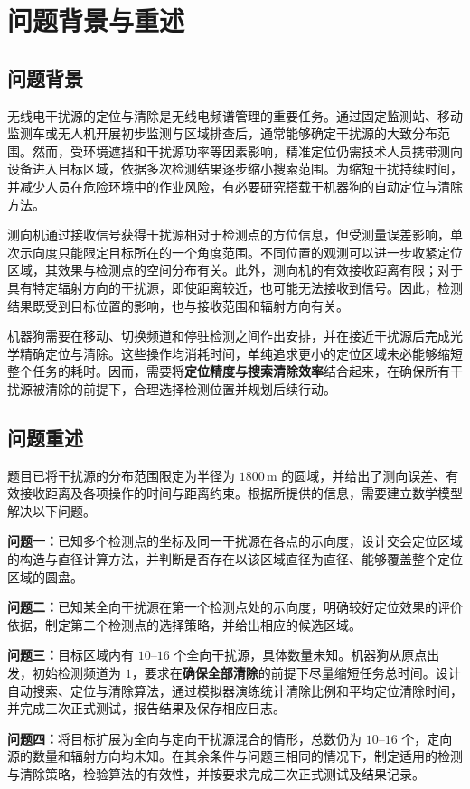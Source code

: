 \documentclass[UTF8,a4paper,12pt]{ctexart}
\begin{document}
\section{问题背景与重述}
\subsection{问题背景}
无线电干扰源的定位与清除是无线电频谱管理的重要任务。通过固定监测站、移动监测车或无人机开展初步监测与区域排查后，通常能够确定干扰源的大致分布范围。然而，受环境遮挡和干扰源功率等因素影响，精准定位仍需技术人员携带测向设备进入目标区域，依据多次检测结果逐步缩小搜索范围。为缩短干扰持续时间，并减少人员在危险环境中的作业风险，有必要研究搭载于机器狗的自动定位与清除方法。

测向机通过接收信号获得干扰源相对于检测点的方位信息，但受测量误差影响，单次示向度只能限定目标所在的一个角度范围。不同位置的观测可以进一步收紧定位区域，其效果与检测点的空间分布有关。此外，测向机的有效接收距离有限；对于具有特定辐射方向的干扰源，即使距离较近，也可能无法接收到信号。因此，检测结果既受到目标位置的影响，也与接收范围和辐射方向有关。

机器狗需要在移动、切换频道和停驻检测之间作出安排，并在接近干扰源后完成光学精确定位与清除。这些操作均消耗时间，单纯追求更小的定位区域未必能够缩短整个任务的耗时。因而，需要将\textbf{定位精度与搜索清除效率}结合起来，在确保所有干扰源被清除的前提下，合理选择检测位置并规划后续行动。
\subsection{问题重述}
题目已将干扰源的分布范围限定为半径为 $1800\,\mathrm m$ 的圆域，并给出了测向误差、有效接收距离及各项操作的时间与距离约束。根据所提供的信息，需要建立数学模型解决以下问题。

\textbf{问题一：}已知多个检测点的坐标及同一干扰源在各点的示向度，设计交会定位区域的构造与直径计算方法，并判断是否存在以该区域直径为直径、能够覆盖整个定位区域的圆盘。

\textbf{问题二：}已知某全向干扰源在第一个检测点处的示向度，明确较好定位效果的评价依据，制定第二个检测点的选择策略，并给出相应的候选区域。

\textbf{问题三：}目标区域内有 $10$--$16$ 个全向干扰源，具体数量未知。机器狗从原点出发，初始检测频道为 $1$，要求在\textbf{确保全部清除}的前提下尽量缩短任务总时间。设计自动搜索、定位与清除算法，通过模拟器演练统计清除比例和平均定位清除时间，并完成三次正式测试，报告结果及保存相应日志。

\textbf{问题四：}将目标扩展为全向与定向干扰源混合的情形，总数仍为 $10$--$16$ 个，定向源的数量和辐射方向均未知。在其余条件与问题三相同的情况下，制定适用的检测与清除策略，检验算法的有效性，并按要求完成三次正式测试及结果记录。
\end{document}
